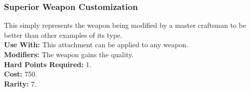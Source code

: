 \subsubsection{Superior Weapon Customization}
This simply represents the weapon being modified by
a master craftsman to be better than other examples
of its type.\\
\textbf{Use With:} This attachment can be applied to any weapon.\\
\textbf{Modifiers:} The weapon gains the  quality.\\
\textbf{Hard Points Required:} 1.\\
\textbf{Cost:} 750.\\
\textbf{Rarity:} 7.\\
